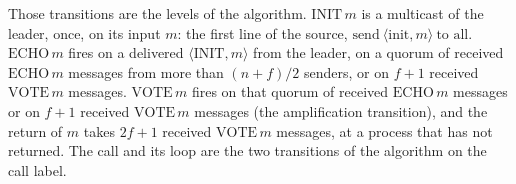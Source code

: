 \begin{definition}
  Those transitions are the levels of the algorithm.
  $\mathrm{INIT}\,m$ is a multicast of the leader, once, on its input $m$: the first line of the source, $\text{send}\ \langle\mathrm{init}, m\rangle\ \text{to all}$.
  $\mathrm{ECHO}\,m$ fires on a delivered $\langle\mathrm{INIT}, m\rangle$ from the leader, on a quorum of received $\mathrm{ECHO}\,m$ messages from more than $(n+f)/2$ senders, or on $f{+}1$ received $\mathrm{VOTE}\,m$ messages.
  $\mathrm{VOTE}\,m$ fires on that quorum of received $\mathrm{ECHO}\,m$ messages or on $f{+}1$ received $\mathrm{VOTE}\,m$ messages (the amplification transition), and the return of $m$ takes $2f{+}1$ received $\mathrm{VOTE}\,m$ messages, at a process that has not returned.
  The call and its loop are the two transitions of the algorithm on the call label.
\end{definition}
